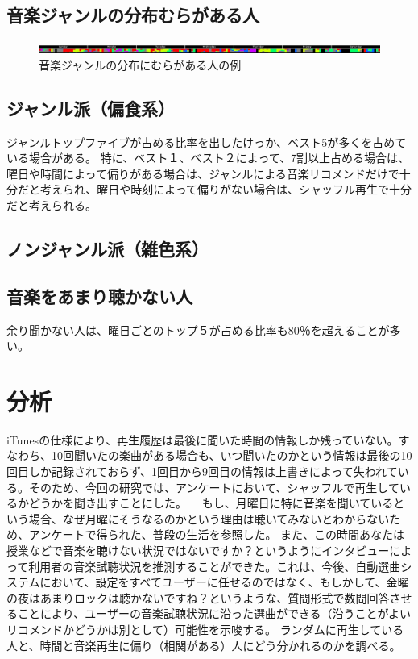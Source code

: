 \documentclass{jsarticle}
\begin{document}
\subsection{音楽ジャンルの分布むらがある人}
\begin{figure}[h]
\begin{center}
\includegraphics[width=14cm]{genreMap_irregular.jpg}
\caption{音楽ジャンルの分布にむらがある人の例}
\label{genreMap_irregular}
\end{center}
\end{figure}

\subsection{ジャンル派（偏食系）}
ジャンルトップファイブが占める比率を出したけっか、ベスト5が多くを占めている場合がある。
特に、ベスト１、ベスト２によって、7割以上占める場合は、曜日や時間によって偏りがある場合は、ジャンルによる音楽リコメンドだけで十分だと考えられ、曜日や時刻によって偏りがない場合は、シャッフル再生で十分だと考えられる。


\subsection{ノンジャンル派（雑色系）}

\subsection{音楽をあまり聴かない人}
余り聞かない人は、曜日ごとのトップ５が占める比率も80％を超えることが多い。


\section{分析}
iTunesの仕様により、再生履歴は最後に聞いた時間の情報しか残っていない。すなわち、10回聞いたの楽曲がある場合も、いつ聞いたのかという情報は最後の10回目しか記録されておらず、1回目から9回目の情報は上書きによって失われている。そのため、今回の研究では、アンケートにおいて、シャッフルで再生しているかどうかを聞き出すことにした。
　もし、月曜日に特に音楽を聞いているという場合、なぜ月曜にそうなるのかという理由は聴いてみないとわからないため、アンケートで得られた、普段の生活を参照した。
また、この時間あなたは授業などで音楽を聴けない状況ではないですか？というようにインタビューによって利用者の音楽試聴状況を推測することができた。これは、今後、自動選曲システムにおいて、設定をすべてユーザーに任せるのではなく、もしかして、金曜の夜はあまりロックは聴かないですね？というような、質問形式で数問回答させることにより、ユーザーの音楽試聴状況に沿った選曲ができる（沿うことがよいリコメンドかどうかは別として）可能性を示唆する。
ランダムに再生している人と、時間と音楽再生に偏り（相関がある）人にどう分かれるのかを調べる。
\end{document}
